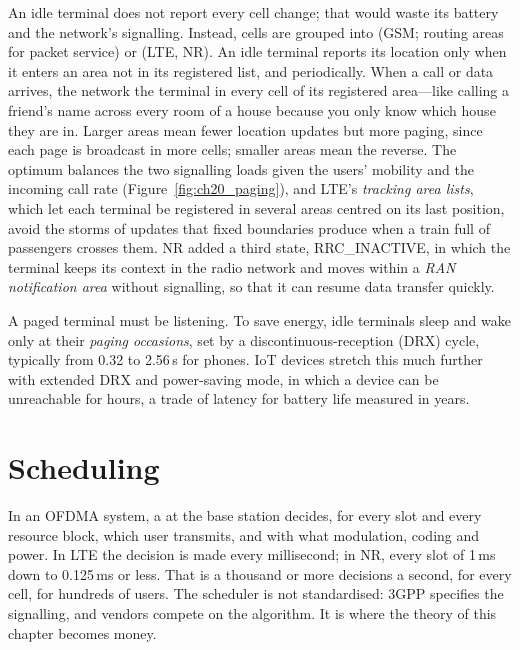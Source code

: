 An idle terminal does not report every cell change; that would waste its battery and the network's signalling. Instead,
cells are grouped into  (GSM; routing areas for packet service) or  (LTE, NR).
An idle terminal reports its location only when it enters an area not in its registered list, and periodically. When a
call or data arrives, the network  the terminal in every cell of its registered area---like calling a
friend's name across every room of a house because you only know which house they are in. Larger areas mean
fewer location updates but more paging, since each page is broadcast in more cells; smaller areas mean the reverse. The
optimum balances the two signalling loads given the users' mobility and the incoming call rate
(Figure~\ref{fig:ch20_paging}), and LTE's \emph{tracking area lists}, which let each terminal be registered in several
areas centred on its last position, avoid the storms of updates that fixed boundaries produce when a train full of
passengers crosses them. NR added a third state, RRC\_INACTIVE, in which the terminal keeps its context in the radio
network and moves within a \emph{RAN notification area} without signalling, so that it can resume data transfer quickly.


A paged terminal must be listening. To save energy, idle terminals sleep and wake only at their \emph{paging occasions},
set by a discontinuous-reception (DRX) cycle, typically from 0.32 to 2.56\,s for phones. IoT devices stretch this much
further with extended DRX and power-saving mode, in which a device can be unreachable for hours, a trade of latency for
battery life measured in years.

\section{Scheduling}
\label{sec:ch20:scheduling}

In an OFDMA system, a  at the base station decides, for every slot and every resource block, which user
transmits, and with what modulation, coding and power. In LTE the decision is made every millisecond; in NR, every slot
of 1\,ms down to 0.125\,ms or less. That is a thousand or more decisions a second, for every cell, for hundreds of users.
The scheduler is not standardised: 3GPP specifies the signalling, and vendors compete on the algorithm. It is where the
theory of this chapter becomes money.

